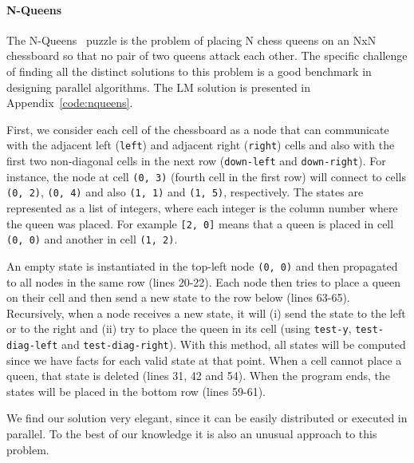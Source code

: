 \paragraph{N-Queens}

The N-Queens~\cite{8queens} puzzle is the problem of placing N chess queens on an NxN chessboard so
that no pair of two queens attack each other. The specific challenge of finding all the distinct
solutions to this problem is a good benchmark in designing parallel algorithms. The LM solution is presented
in Appendix~\ref{code:nqueens}.

First, we consider each cell of the chessboard as a node that can communicate with the adjacent left
(\texttt{left}) and adjacent right (\texttt{right}) cells and also with the first two non-diagonal cells in the next row
(\texttt{down-left} and \texttt{down-right}). For instance, the node at cell \texttt{(0,~3)} (fourth cell in the first row) will connect
to cells \texttt{(0,~2)}, \texttt{(0,~4)} and also \texttt{(1,~1)} and \texttt{(1,~5)}, respectively. The states are represented as a list
of integers, where each integer is the column number where the queen was placed. For example \texttt{[2, 0]}
means that a queen is placed in cell \texttt{(0,~0)} and another in cell \texttt{(1,~2)}.

An empty state is instantiated in the top-left node \texttt{(0,~0)} and then propagated to all nodes in the same row (lines 20-22).
Each node then tries to place a queen on their cell and then send a new state to the row below (lines 63-65).
Recursively, when a node receives a new state, it will (i) send the state to the left
or to the right and (ii) try to place the queen in its cell (using \texttt{test-y}, \texttt{test-diag-left} and \texttt{test-diag-right}). With this method,
all states will be computed since we have facts for each valid state
at that point. When a cell cannot place a queen, that state is deleted (lines 31, 42 and 54).
When the program ends, the states will be placed in the bottom row (lines 59-61).

We find our solution very elegant, since it can be easily distributed or executed in parallel.
To the best of our knowledge it is also an unusual approach to this problem.

